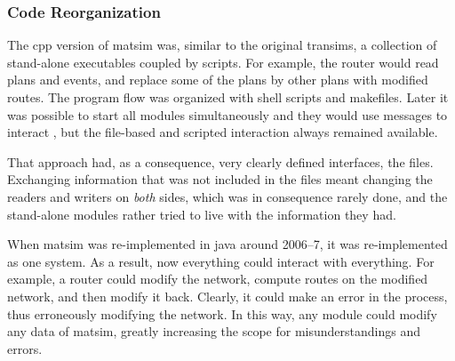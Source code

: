 

%


\subsubsection{Code Reorganization}
\label{sec:matsim-core-reorg}
The \gls{cpp} version of \gls{matsim} was, similar to the original \gls{transims}, a collection of stand-alone executables coupled by scripts.  For example, the router would read plans and events, and replace some of the plans by other plans with modified routes.  The program flow was organized with shell scripts and makefiles.  Later it was possible to start all modules simultaneously and they would use messages to interact \citep[also see][]{GloorNagel2005ped-att04-birkh}, but the file-based and scripted interaction always remained available.

That approach had, as a consequence, very clearly defined interfaces, \ie the files. Exchanging information that was not included in the files meant changing the readers and writers on \emph{both} sides, which was in consequence rarely done, and the stand-alone modules rather tried to live with the information they had.

When \gls{matsim} was re-implemented in \gls{java} around 2006--7, it was re-implemented as one system.  As a result, now everything could interact with everything.  For example, a router could modify the network, compute routes on the modified network, and then modify it back. Clearly, it could make an error in the process, thus erroneously modifying the network.  In this way, any module could modify any data of \gls{matsim}, greatly increasing the scope for misunderstandings and errors.

